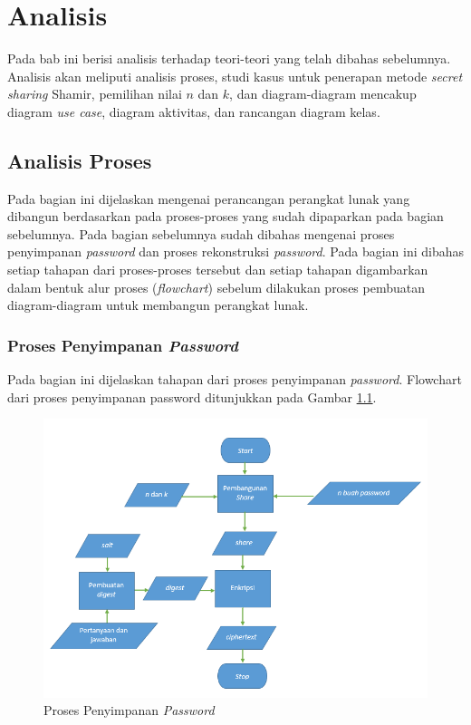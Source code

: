 \chapter{Analisis}
\label{chap:analisis}

Pada bab ini berisi analisis terhadap teori-teori yang telah dibahas sebelumnya. Analisis akan meliputi analisis proses, studi kasus untuk penerapan metode \textit{secret sharing} Shamir, pemilihan nilai \begin{math}n\end{math} dan \begin{math}k\end{math}, dan diagram-diagram mencakup diagram \textit{use case}, diagram aktivitas, dan rancangan diagram kelas.

\section{Analisis Proses}\label{sec:analisis}

Pada bagian ini dijelaskan mengenai perancangan perangkat lunak yang dibangun berdasarkan pada proses-proses yang sudah dipaparkan pada bagian sebelumnya. Pada bagian sebelumnya sudah dibahas mengenai proses penyimpanan \textit{password} dan proses rekonstruksi \textit{password}. Pada bagian ini dibahas setiap tahapan dari proses-proses tersebut dan setiap tahapan digambarkan dalam bentuk alur proses (\textit{flowchart}) sebelum dilakukan proses pembuatan diagram-diagram untuk membangun perangkat lunak.

\subsection{Proses Penyimpanan \textit{Password}}

Pada bagian ini dijelaskan tahapan dari proses penyimpanan \textit{password}. Flowchart dari proses penyimpanan password ditunjukkan pada Gambar \ref{fig:create_share}.

\begin{figure}[h]
	\centerline{\includegraphics[scale=0.6]{Gambar/flowchart_share}}
	\caption{Proses Penyimpanan \textit{Password}}\label{fig:create_share}
\end{figure}

